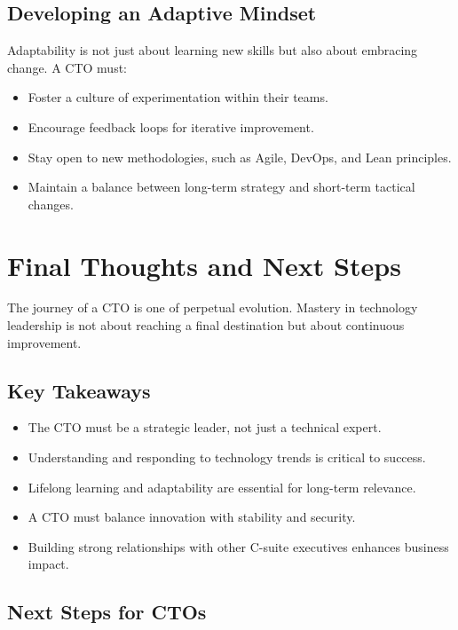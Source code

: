 \subsection{Developing an Adaptive Mindset}

Adaptability is not just about learning new skills but also about embracing change. A CTO must:

\begin{itemize}
    \item Foster a culture of experimentation within their teams.
    \item Encourage feedback loops for iterative improvement.
    \item Stay open to new methodologies, such as Agile, DevOps, and Lean principles.
    \item Maintain a balance between long-term strategy and short-term tactical changes.
\end{itemize}

\section{Final Thoughts and Next Steps}

The journey of a CTO is one of perpetual evolution. Mastery in technology leadership is not about reaching a final destination but about continuous improvement.

\subsection{Key Takeaways}

\begin{itemize}
    \item The CTO must be a strategic leader, not just a technical expert.
    \item Understanding and responding to technology trends is critical to success.
    \item Lifelong learning and adaptability are essential for long-term relevance.
    \item A CTO must balance innovation with stability and security.
    \item Building strong relationships with other C-suite executives enhances business impact.
\end{itemize}

\subsection{Next Steps for CTOs}

